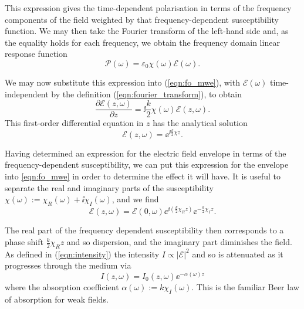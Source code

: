     This expression gives the time-dependent polarisation in terms of the
    frequency components of the field weighted by that frequency-dependent
    susceptibility function. We may then take the Fourier transform of the 
    left-hand side and, as the equality holds for each frequency, we obtain the
    frequency domain linear response function
    \begin{equation}\label{eqn:lin_pol_freq} 
      \mathcal{P}(\omega) = \varepsilon_0 \chi(\omega) \mathcal{E}(\omega).
    \end{equation}

    We may now substitute this expression into (\ref{eqn:fo_mwe}), with
    $\mathcal{E}(\omega)$ time-independent by the definition
    (\ref{eqn:fourier_transform}), to obtain
    \begin{equation}\label{eqn:fo_mwe_linear}
      \frac{\partial \mathcal{E}(z, \omega)}{\partial z} = 
      \ii \frac{k}{2} \chi(\omega) \mathcal{E}(z, \omega).
    \end{equation}
    This first-order differential equation in $z$ has the analytical solution 
    \begin{equation}
      \mathcal{E}(z, \omega) = \ee^{\ii \tfrac{k}{2} \chi z}.
    \end{equation}

    Having determined an expression for the electric field envelope in terms of
    the frequency-dependent susceptibility, we can put this expression for the
    envelope into \ref{eqn:fo_mwe} in order to determine the effect it will
    have. It is useful to separate the real and imaginary parts of the
    susceptibility $\chi(\omega) := \chi_R(\omega) + \ii \chi_I(\omega)$, and we
    find
    \begin{equation}\label{eqn:efield_susc_real_imag}
      \mathcal{E}(z, \omega) = 
      \mathcal{E}(0, \omega)    
      \ee^{\ii(\frac{k}{2} \chi_R z)} 
      \ee^{- \frac{k}{2} \chi_I z}.
    \end{equation}

    The real part of the frequency dependent susceptibility then corresponds to
    a phase shift $\frac{k}{2} \chi_R z$ and so dispersion, and the imaginary
    part diminishes the field. As defined in (\ref{eqn:intensity}) the intensity
    $I \propto |\mathcal{E}|^2$ and so is attenuated as it progresses through
    the medium via
    \begin{equation}\label{eqn:beer_law}
      I(z, \omega) = I_0(z, \omega) \ee^{-\alpha(\omega) z}
    \end{equation}
    where the absorption coefficient $\alpha(\omega) := k \chi_I(\omega)$. This
    is the familiar Beer law of absorption for weak fields.
    
